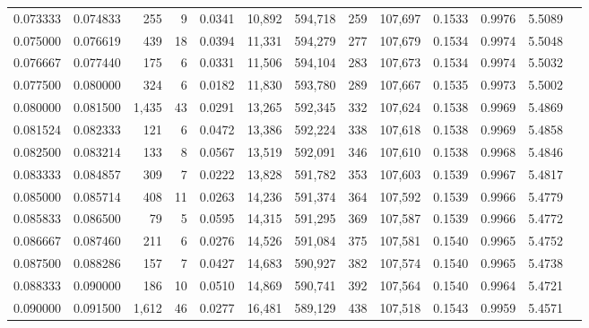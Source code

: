 \begin{tabular}{rrrrrrrrrrrrr}
0.073333 & 0.074833 &   255 &   9 &                                     0.0341 &  10,892 & 594,718 &     259 & 107,697 & 0.1533 & 0.9976 & 5.5089 \\
0.075000 & 0.076619 &   439 &  18 &                                     0.0394 &  11,331 & 594,279 &     277 & 107,679 & 0.1534 & 0.9974 & 5.5048 \\
0.076667 & 0.077440 &   175 &   6 &                                     0.0331 &  11,506 & 594,104 &     283 & 107,673 & 0.1534 & 0.9974 & 5.5032 \\
0.077500 & 0.080000 &   324 &   6 &                                     0.0182 &  11,830 & 593,780 &     289 & 107,667 & 0.1535 & 0.9973 & 5.5002 \\
0.080000 & 0.081500 & 1,435 &  43 &                                     0.0291 &  13,265 & 592,345 &     332 & 107,624 & 0.1538 & 0.9969 & 5.4869 \\
0.081524 & 0.082333 &   121 &   6 &                                     0.0472 &  13,386 & 592,224 &     338 & 107,618 & 0.1538 & 0.9969 & 5.4858 \\
0.082500 & 0.083214 &   133 &   8 &                                     0.0567 &  13,519 & 592,091 &     346 & 107,610 & 0.1538 & 0.9968 & 5.4846 \\
0.083333 & 0.084857 &   309 &   7 &                                     0.0222 &  13,828 & 591,782 &     353 & 107,603 & 0.1539 & 0.9967 & 5.4817 \\
0.085000 & 0.085714 &   408 &  11 &                                     0.0263 &  14,236 & 591,374 &     364 & 107,592 & 0.1539 & 0.9966 & 5.4779 \\
0.085833 & 0.086500 &    79 &   5 &                                     0.0595 &  14,315 & 591,295 &     369 & 107,587 & 0.1539 & 0.9966 & 5.4772 \\
0.086667 & 0.087460 &   211 &   6 &                                     0.0276 &  14,526 & 591,084 &     375 & 107,581 & 0.1540 & 0.9965 & 5.4752 \\
0.087500 & 0.088286 &   157 &   7 &                                     0.0427 &  14,683 & 590,927 &     382 & 107,574 & 0.1540 & 0.9965 & 5.4738 \\
0.088333 & 0.090000 &   186 &  10 &                                     0.0510 &  14,869 & 590,741 &     392 & 107,564 & 0.1540 & 0.9964 & 5.4721 \\
0.090000 & 0.091500 & 1,612 &  46 &                                     0.0277 &  16,481 & 589,129 &     438 & 107,518 & 0.1543 & 0.9959 & 5.4571 \\

\end{tabular}
